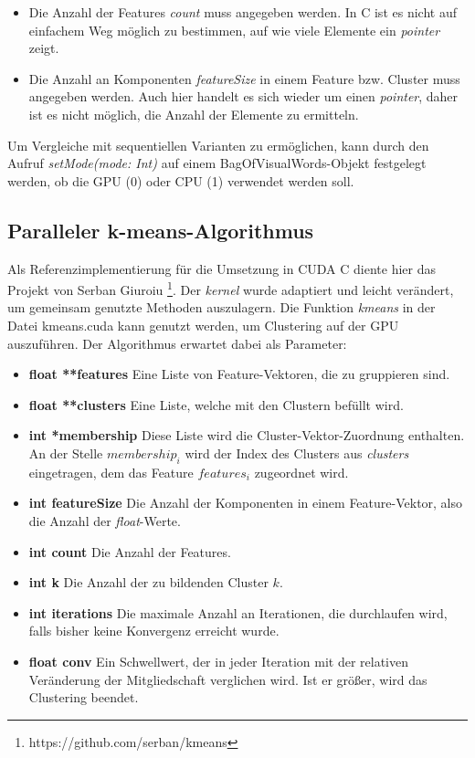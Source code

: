 \begin{itemize}
	\item Die Anzahl der Features \textit{count} muss angegeben werden. In C ist es nicht auf einfachem Weg möglich zu bestimmen, auf wie viele Elemente ein \textit{pointer} zeigt.
	\item Die Anzahl an Komponenten \textit{featureSize} in einem Feature bzw. Cluster muss angegeben werden. Auch hier handelt es sich wieder um einen \textit{pointer}, daher ist es nicht möglich, die Anzahl der Elemente zu ermitteln.
\end{itemize}

Um Vergleiche mit sequentiellen Varianten zu ermöglichen, kann durch den Aufruf \textit{setMode(mode: Int)} auf einem BagOfVisualWords-Objekt festgelegt werden, ob die GPU (0) oder CPU (1) verwendet werden soll.

\subsection{Paralleler k-means-Algorithmus}

Als Referenzimplementierung für die Umsetzung in CUDA C diente hier das Projekt von Serban Giuroiu \footnote{https://github.com/serban/kmeans}. Der \textit{kernel} wurde adaptiert und leicht verändert, um gemeinsam genutzte Methoden auszulagern. Die Funktion \textit{kmeans} in der Datei kmeans.cuda kann genutzt werden, um Clustering auf der GPU auszuführen. Der Algorithmus erwartet dabei als Parameter:

\begin{itemize}
	\item \textbf{float **features} Eine Liste von Feature-Vektoren, die zu gruppieren sind.	
	\item \textbf{float **clusters} Eine Liste, welche mit den Clustern befüllt wird.
	\item \textbf{int *membership} Diese Liste wird die Cluster-Vektor-Zuordnung enthalten. An der Stelle $membership_i$  wird der Index des Clusters aus \textit{clusters} eingetragen, dem das Feature $features_i$ zugeordnet wird.
	\item \textbf{int featureSize} Die Anzahl der Komponenten in einem Feature-Vektor, also die Anzahl der \textit{float}-Werte.	
	\item \textbf{int count} Die Anzahl der Features.
	\item \textbf{int k} Die Anzahl der zu bildenden Cluster $k$.
	\item \textbf{int iterations} Die maximale Anzahl an Iterationen, die durchlaufen wird, falls bisher keine Konvergenz erreicht wurde.
	\item \textbf{float conv} Ein Schwellwert, der in jeder Iteration mit der relativen Veränderung der Mitgliedschaft verglichen wird. Ist er größer, wird das Clustering beendet.
\end{itemize}

